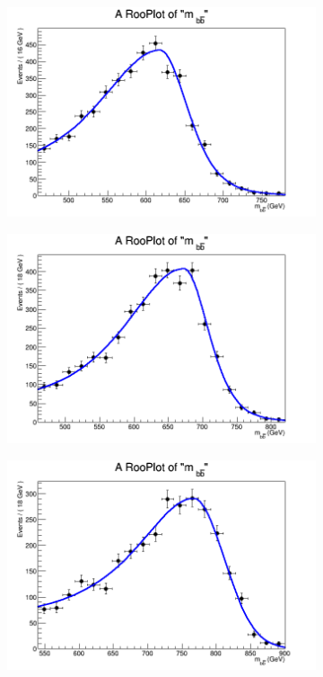 \begin{figure}[phtb!]
\begin{center}
  \begin{subfigure}[$m_{A}=650$ GeV]{0.4\textwidth}\includegraphics[width=\textwidth]{FitResults/images/fitMC_bAbb650_1.png}\end{subfigure}
  \begin{subfigure}[$m_{A}=700$ GeV]{0.4\textwidth}\includegraphics[width=\textwidth]{FitResults/images/fitMC_bAbb700_1.png}\end{subfigure}
  \begin{subfigure}[$m_{A}=800$ GeV]{0.4\textwidth}\includegraphics[width=\textwidth]{FitResults/images/fitMC_bAbb800_1.png}\end{subfigure}

\end{center}
\end{figure}
